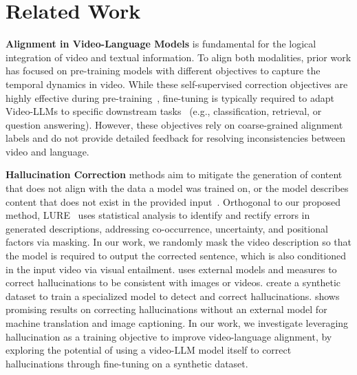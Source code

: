 \section{Related Work}
\label{app:related_work}


\noindent\textbf{Alignment in Video-Language Models} is fundamental for the logical integration of video and textual information. To align both modalities, prior work has focused on pre-training models with different objectives to capture the temporal dynamics in video. 
While these self-supervised correction objectives are highly effective during pre-training~\cite{li2023lavender, wang2022ofa, zhu2024languagebind, ge2022bridging}, fine-tuning is typically required to adapt Video-LLMs to specific downstream tasks~\cite{videochat, videollama, bansal2024videocon} (e.g., classification, retrieval, or question answering).
However, these objectives rely on coarse-grained alignment labels and do not provide detailed feedback for resolving inconsistencies between video and language.

\noindent\textbf{Hallucination Correction} methods aim to mitigate the generation of content that does not align with the data a model was trained on, or the model describes content that does not exist in the provided input~\cite{huang2024opera}. Orthogonal to our proposed method, LURE~\cite{zhou2024analyzing} uses statistical analysis to identify and rectify errors in generated descriptions, addressing co-occurrence, uncertainty, and positional factors via masking. In our work, we randomly mask the video description so that the model is required to output the corrected sentence, which is also conditioned in the input video via visual entailment. 
\citet{yin2023woodpecker, wang2023paxion} uses external models and measures to correct hallucinations to be consistent with images or videos.
\citet{zhou-etal-2021-detecting, liu2023mitigating, xiao2024detecting, zhao-etal-2024-successfully} create a synthetic dataset to train a specialized model to detect and correct hallucinations.
\citet{dale2022detecting, huang2024opera} shows promising results on correcting hallucinations without an external model for machine translation and image captioning.
In our work, we investigate leveraging hallucination as a training objective to improve video-language alignment, by exploring the potential of using a video-LLM model itself to correct hallucinations through fine-tuning on a synthetic dataset.
